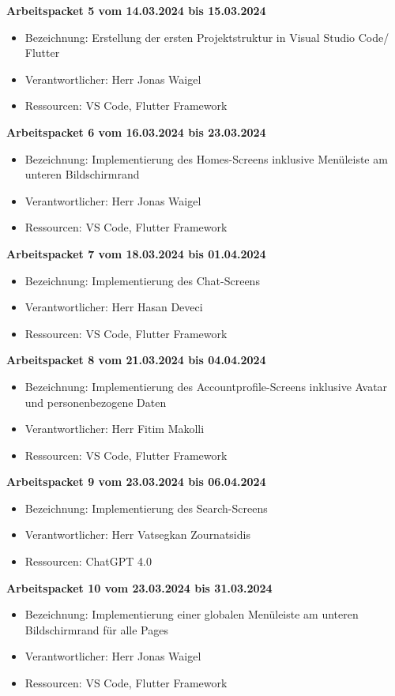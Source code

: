 \newpage
\textbf{Arbeitspacket 5 vom 14.03.2024 bis 15.03.2024}
\begin{itemize}[itemsep=0pt]
	\item{Bezeichnung: Erstellung der ersten Projektstruktur in Visual Studio Code/ Flutter}
	\item{Verantwortlicher: Herr Jonas Waigel} 
	\item{Ressourcen: VS Code, Flutter Framework} 
\end{itemize}

\textbf{Arbeitspacket 6 vom 16.03.2024 bis 23.03.2024}
\begin{itemize}[itemsep=0pt]
	\item{Bezeichnung: Implementierung des Homes-Screens inklusive Menüleiste am unteren Bildschirmrand}
	\item{Verantwortlicher: Herr Jonas Waigel} 
	\item{Ressourcen: VS Code, Flutter Framework} 
\end{itemize}

\textbf{Arbeitspacket 7 vom 18.03.2024 bis 01.04.2024}
\begin{itemize}[itemsep=0pt]
	\item{Bezeichnung: Implementierung des Chat-Screens}
	\item{Verantwortlicher: Herr Hasan Deveci} 
	\item{Ressourcen: VS Code, Flutter Framework} 
\end{itemize} 

\textbf{Arbeitspacket 8 vom 21.03.2024 bis 04.04.2024}
\begin{itemize}[itemsep=0pt]
	\item{Bezeichnung: Implementierung des Accountprofile-Screens inklusive Avatar und personenbezogene Daten}
	\item{Verantwortlicher: Herr Fitim Makolli} 
	\item{Ressourcen: VS Code, Flutter Framework} 
\end{itemize}


\textbf{Arbeitspacket 9 vom 23.03.2024 bis 06.04.2024}
\begin{itemize}[itemsep=0pt]
	\item{Bezeichnung: Implementierung des Search-Screens}
	\item{Verantwortlicher: Herr Vatsegkan Zournatsidis} 
	\item{Ressourcen: ChatGPT 4.0} 
\end{itemize}

\textbf{Arbeitspacket 10 vom 23.03.2024 bis 31.03.2024}
\begin{itemize}[itemsep=0pt]
	\item{Bezeichnung: Implementierung einer globalen Menüleiste am unteren Bildschirmrand für alle Pages}
	\item{Verantwortlicher: Herr Jonas Waigel} 
	\item{Ressourcen: VS Code, Flutter Framework} 
\end{itemize} 

